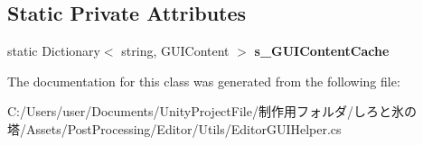 \subsection*{Static Private Attributes}
\begin{DoxyCompactItemize}
\item 
\mbox{\label{class_unity_editor_1_1_post_processing_1_1_editor_g_u_i_helper_a4719f4feec417d779454cf124aa77d35}} 
static Dictionary$<$ string, G\+U\+I\+Content $>$ {\bfseries s\+\_\+\+G\+U\+I\+Content\+Cache}
\end{DoxyCompactItemize}


The documentation for this class was generated from the following file\+:\begin{DoxyCompactItemize}
\item 
C\+:/\+Users/user/\+Documents/\+Unity\+Project\+File/制作用フォルダ/しろと氷の塔/\+Assets/\+Post\+Processing/\+Editor/\+Utils/Editor\+G\+U\+I\+Helper.\+cs\end{DoxyCompactItemize}
